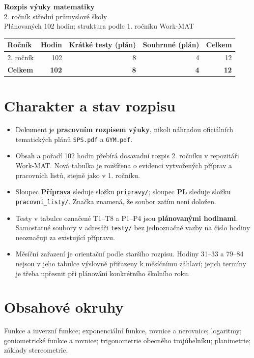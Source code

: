 \documentclass[10pt,a4paper]{article}
\newcommand{\chybi}{\mbox{\ttfamily\char45\kern0pt\char45\kern0pt\char45}}
\begin{document}
\begin{center}
{\LARGE\bfseries Rozpis výuky matematiky}\\[3mm]
{\large 2. ročník střední průmyslové školy}\\[3mm]
{\small Plánovaných 102 hodin; struktura podle 1. ročníku Work-MAT}
\end{center}
\vspace{3mm}
\begin{tabularx}{\textwidth}{@{}Xrrrr@{}}\toprule
\textbf{Ročník} & \textbf{Hodin} & \textbf{Krátké testy (plán)} & \textbf{Souhrnné (plán)} & \textbf{Celkem}\\\midrule
2. ročník & 102 & 8 & 4 & 12\\\midrule
\textbf{Celkem} & \textbf{102} & \textbf{8} & \textbf{4} & \textbf{12}\\\bottomrule
\end{tabularx}
\vspace{3mm}
\section*{Charakter a stav rozpisu}
\begin{itemize}\setlength{\itemsep}{2pt}
\item Dokument je \textbf{pracovním rozpisem výuky}, nikoli náhradou oficiálních tematických plánů \texttt{SPS.pdf} a \texttt{GYM.pdf}.
\item Obsah a pořadí 102 hodin přebírá dosavadní rozpis 2. ročníku v repozitáři Work-MAT. Nová tabulka je rozšířena o evidenci vytvořených příprav a pracovních listů, stejně jako v 1. ročníku.
\item Sloupec \textbf{Příprava} sleduje složku \texttt{pripravy/}; sloupec \textbf{PL} sleduje složku \texttt{pracovni\_listy/}. Značka \chybi{} znamená, že soubor zatím není doložen.
\item Testy v tabulce označené T1--T8 a P1--P4 jsou \textbf{plánovanými hodinami}. Samostatné soubory v adresáři \texttt{testy/} bez jednoznačné vazby na číslo hodiny neoznačuji za existující přípravu.
\item Měsíční zařazení je orientační podle staršího rozpisu. Hodiny 31--33 a 79--84 nejsou v jeho tabulce výslovně přiřazeny k měsíčnímu záhlaví; jejich termíny je třeba upřesnit při plánování konkrétního školního roku.
\end{itemize}
\section*{Obsahové okruhy}
Funkce a inverzní funkce; exponenciální funkce, rovnice a nerovnice; logaritmy; goniometrické funkce a rovnice; trigonometrie obecného trojúhelníku; planimetrie; základy stereometrie.
\clearpage
\end{document}
